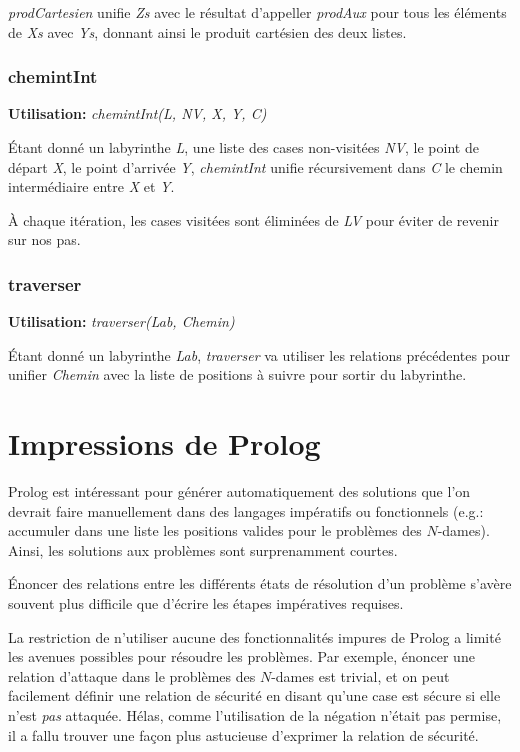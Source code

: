 \documentclass[10pt]{article}
\newcommand{\usage}[1]{\textbf{Utilisation: }\emph{#1}}
\begin{document}
\emph{prodCartesien} unifie \emph{Zs} avec le résultat d'appeller
\emph{prodAux} pour tous les éléments de \emph{Xs} avec \emph{Ys},
donnant ainsi le produit cartésien des deux listes.


\subsubsection{chemintInt}

\usage{chemintInt(L, NV, X, Y, C)}

Étant donné un labyrinthe \emph{L}, une liste des cases non-visitées
\emph{NV}, le point de départ \emph{X}, le point d'arrivée \emph{Y},
\emph{chemintInt} unifie récursivement dans \emph{C} le chemin
intermédiaire entre \emph{X} et \emph{Y}.

À chaque itération, les cases visitées sont éliminées de \emph{LV}
pour éviter de revenir sur nos pas.


\subsubsection{traverser}

\usage{traverser(Lab, Chemin)}

Étant donné un labyrinthe \emph{Lab}, \emph{traverser} va utiliser les
relations précédentes pour unifier \emph{Chemin} avec la liste de
positions à suivre pour sortir du labyrinthe.


\section{Impressions de Prolog}

Prolog est intéressant pour générer automatiquement des solutions que
l'on devrait faire manuellement dans des langages impératifs ou
fonctionnels (e.g.: accumuler dans une liste les positions valides
pour le problèmes des $N$-dames).  Ainsi, les solutions aux problèmes
sont surprenamment courtes.

Énoncer des relations entre les différents états de résolution d'un
problème s'avère souvent plus difficile que d'écrire les étapes
impératives requises.

La restriction de n'utiliser aucune des fonctionnalités impures de
Prolog a limité les avenues possibles pour résoudre les problèmes.
Par exemple, énoncer une relation d'attaque dans le problèmes des
$N$-dames est trivial, et on peut facilement définir une relation de
sécurité en disant qu'une case est sécure si elle n'est \emph{pas}
attaquée.  Hélas, comme l'utilisation de la négation n'était pas
permise, il a fallu trouver une façon plus astucieuse d'exprimer la
relation de sécurité.
\end{document}
